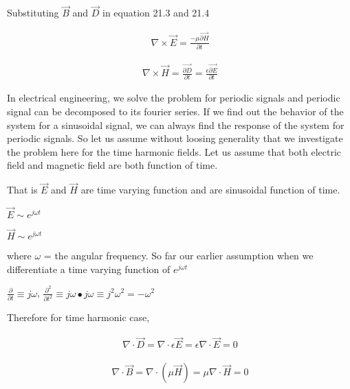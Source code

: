 		Substituting $\vec{B}$ and 	$\vec{D}$ in equation 21.3 and 21.4
		
		\begin{align}
		\nabla\times\vec{E}=\frac{-\mu\vec{\partial H}}{\partial t}
		\end{align}
		
		
		
		\bigskip
		\begin{align}
		\nabla\times\vec{H}=\frac{\vec{\partial D}}{\partial t}=\frac{\epsilon\vec{\partial E}}{\partial t}
		\end{align}
		
		
		\bigskip 
		In electrical engineering, we solve the problem for periodic signals and periodic signal can be decomposed to its fourier series. If we find out the behavior of the system for a sinusoidal signal, we can always find the response of the system for periodic signals. So let us assume without loosing generality that we investigate the problem here for the time harmonic fields. Let us assume that both electric field and magnetic field are both function of time.
		
		\bigskip
		
		That is $\vec{E}$ and $\vec{H}$ are time varying function and are sinusoidal function of time.
		
		\bigskip
		
		$\vec{E} \sim e^{j\omega t}$
		
		$\vec{H} \sim e^{j\omega t}$
		
		\bigskip
		
		where 
		$\omega$ = the angular frequency.
		So far our earlier assumption when we differentiate a time varying function of  $e^{j\omega t}$
		
		\bigskip
		
		$\frac{\partial}{\partial t} \equiv j\omega$,  
		$\frac{\partial^2}{\partial t^2} \equiv j\omega \bullet j\omega \equiv j^2\omega^2=-\omega^2$
		
		\bigskip
		
		Therefore for time harmonic case,
		
		\bigskip
		\begin{align}
		\nabla\cdot\vec{D}=\nabla\cdot \epsilon \vec{E}=\epsilon \nabla\cdot\vec{E}=0
		\end{align}
		
		\begin{align}
		\nabla\cdot\vec{B}=\nabla\cdot (\mu\vec{H})=\mu \nabla\cdot\vec{H}=0
		\end{align}
		

